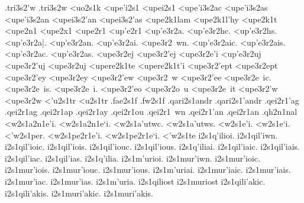 {	.tri3s2'w 		%
	.tri3s2w
<uo2s1k 		%
<upe'i2s1
<upei2s1
	<upe'i3s2ac 		%
	<upe'i3s2as
	<upe'i3s2an
	<upei3s2'an
	<upei3s2'as
<upe2k1lam  		%
<upe2k1l'hy  		%
<upe2k1t    		%
<upe2n1
<upe2x1
<upe2r1
<up'e2r1
	<up'e3r2a.		%
	<up'e3r2hc.
	<up'e3r2hs.
	<up'e3r2a|.
	<up'e3r2an.
	<up'e3r2ai.
	<upe3r2~wn.
	<up'e3r2aic.
	<up'e3r2ais.
	<up'e3r2ac.
	<up'e3r2as. 
	<upe3r2ej		%
	<upe3r2'ej
	<upe3r2e'i		%
	<up'e3r2uj		%
	<upe3r2'uj
	<upe3r2uj		%
<upere2k1te 		%
<upere2k1t'i 		%
	<upe3r2'ept 		%
	<upe3r2ept
	<upe3r2'ey
	<upe3r2ey
	<upe3r2'ew 		%
	<upe3r2~w
	<upe3r2'ee
	<upe3r2e~ic.
	<upe3r2e~is.
	<upe3r2e~i.
	<upe3r2'eo
	<upe3r2o~u
	<upe3r2e~it
	<upe3r2'w 		%
	<upe3r2w 		%
<'u2s1tr 		%
<u2s1tr 		%
.fae2s1f 		%
.fw2s1f  		%
.qari2s1andr 		%
.qari2s1'andr
.qei2r1'ag 		%
.qei2r1ag  		%
.qei2r1ap  		%
.qei2r1ay		%
.qei2r1ou  		%
.qei2r1~wn 		%
.qei2r1'an
.qei2r1an
.qh2n1nal		%
<w2s1a2n1e'i. 		%
<w2s1a2n1e`i.
<w2s1a'utwc.  		%
<w2s1a'utws.
<w2s1e'i.  		%
<w2s1e`i.
<'w2s1per.		%
<w2s1pe2r1e'i. 		%
<w2s1pe2r1e`i.
<'w2s1te  		%
i2s1q'ilioi.  		%
i2s1qil'iwn.
i2s1qil'ioic.
i2s1qil'iois.
i2s1qil'iouc.
i2s1qil'ious.
i2s1q'iliai.
i2s1qil'iaic.
i2s1qil'iais.
i2s1qil'iac.
i2s1qil'ias.
i2s1q'ilia.
%
i2s1m'urioi. 		%
i2s1mur'iwn.
i2s1mur'ioic.
i2s1mur'iois.
i2s1mur'iouc.
i2s1mur'ious.
i2s1m'uriai.
i2s1mur'iaic.
i2s1mur'iais.
i2s1mur'iac.
i2s1mur'ias.
i2s1m'uria.
%
i2s1qiliost  		%
%
i2s1muriost 		%
%
i2s1qili'akic. 		%
i2s1qili'akis.
%
i2s1muri'akic. 		%
i2s1muri'akis.
} %
\endgroup
\endinput
